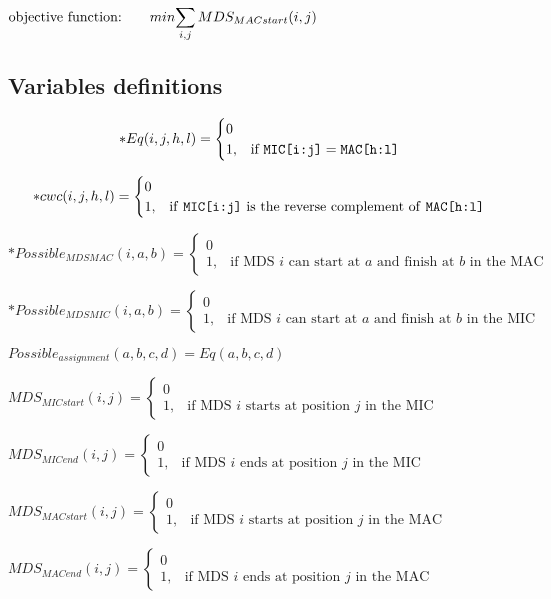 $\mbox{objective function:} \qquad min \mathlarger{\sum_{i,j} MDS_{MACstart}(i,j)}$

\subsection{Variables definitions}

$$ *Eq(i,j,h,l) = \begin{cases} 0 \\ 1, & \mbox{if } \texttt{MIC[i:j]} = \texttt{MAC[h:l]} \end{cases}$$

$$*cwc(i,j,h,l) = \begin{cases} 0 \\ 1, & \mbox{if \texttt{MIC[i:j]} is the reverse complement of \texttt{MAC[h:l]}} \end{cases}$$


$*Possible_{MDSMAC}(i,a,b) = \begin{cases} 0 \\ 1, & \mbox{if MDS } i\mbox{ can start at } a \mbox{ and finish at } b \mbox{ in the MAC} \end{cases}$

$*Possible_{MDSMIC}(i,a,b) = \begin{cases} 0 \\ 1, & \mbox{if MDS } i\mbox{ can start at } a \mbox{ and finish at } b \mbox{ in the MIC} \end{cases}$

$Possible_{assignment}(a,b,c,d) = Eq(a,b,c,d)$

$MDS_{MICstart}(i,j) = \begin{cases} 0 \\ 1, & \mbox{if MDS } i\mbox{ starts at position } j \mbox{ in the MIC} \end{cases}$

$MDS_{MICend}(i,j) = \begin{cases} 0 \\ 1, & \mbox{if MDS } i\mbox{ ends at position } j \mbox{ in the MIC} \end{cases}$

$MDS_{MACstart}(i,j) = \begin{cases} 0 \\ 1, & \mbox{if MDS } i\mbox{ starts at position } j \mbox{ in the MAC} \end{cases}$

$MDS_{MACend}(i,j) = \begin{cases} 0 \\ 1, & \mbox{if MDS } i\mbox{ ends at position } j \mbox{ in the MAC} \end{cases}$

